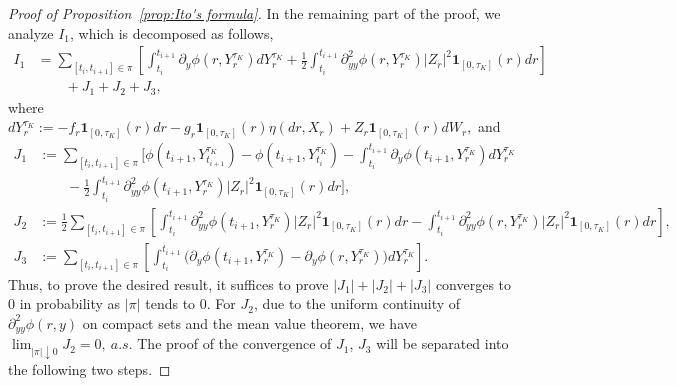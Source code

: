 \documentclass[10pt,a4paper]{amsart}
\begin{document}
\begin{proof}[Proof of Proposition~\ref{prop:Ito's formula}]
In the remaining part of the proof, we analyze $I_{1}$, which is decomposed as follows,
\begin{equation}\label{e:I1}	\begin{aligned}
I_{1} &= \sum_{[t_{i},t_{i+1}]\in \pi}\left[\int_{t_{i}}^{t_{i+1}}\partial_{y}\phi(r,Y^{\tau_{K}}_{r})dY^{\tau_{K}}_{r} + \frac{1}{2}\int_{t_{i}}^{t_{i+1}}\partial^{2}_{yy}\phi(r,Y^{\tau_{K}}_{r})|Z_{r}|^{2}\mathbf{1}_{[0,\tau_{K}]}(r) dr\right]\\
& \qquad + J_{1} + J_{2} + J_{3},
\end{aligned}
\end{equation}
where $dY^{\tau_{K}}_{r} := -f_{r}\mathbf{1}_{[0,\tau_{K}]}(r)dr - g_{r}\mathbf{1}_{[0,\tau_{K}]}(r)\eta(dr,X_{r}) + Z_{r}\mathbf{1}_{[0,\tau_{K}]}(r) dW_{r},$ and
\begin{align*}
J_{1} &:= \sum_{[t_{i},t_{i+1}]\in \pi} \Bigg[\phi(t_{i+1},Y^{\tau_{K}}_{t_{i+1}}) - \phi(t_{i+1},Y^{\tau_{K}}_{t_{i}}) - \int_{t_{i}}^{t_{i+1}}\partial_{y}\phi(t_{i+1},Y^{\tau_{K}}_{r}) dY^{\tau_{K}}_{r}\\
&\qquad  - \frac{1}{2}\int_{t_{i}}^{t_{i+1}}\partial^{2}_{yy}\phi(t_{i+1},Y^{\tau_{K}}_{r})|Z_{r}|^{2}\mathbf{1}_{[0,\tau_{K}]}(r)dr\Bigg],\\
J_{2} &:= \frac{1}{2}\sum_{[t_{i},t_{i+1}]\in \pi}\left[\int_{t_{i}}^{t_{i+1}}\partial^{2}_{yy}\phi(t_{i+1},Y^{\tau_{K}}_{r})|Z_{r}|^{2}\mathbf{1}_{[0,\tau_{K}]}(r)dr - \int_{t_{i}}^{t_{i+1}}\partial^{2}_{yy}\phi(r,Y^{\tau_{K}}_{r})|Z_{r}|^{2}\mathbf{1}_{[0,\tau_{K}]}(r)dr\right],\\
J_{3} &:= \sum_{[t_{i},t_{i+1}]\in\pi}\left[\int_{t_{i}}^{t_{i+1}}\big(\partial_{y}\phi(t_{i+1},Y^{\tau_{K}}_{r}) - \partial_{y}\phi(r,Y^{\tau_{K}}_{r})\big) dY^{\tau_{K}}_{r}\right].
\end{align*}
Thus, to prove the desired result, it suffices to prove $|J_1|+|J_2| +|J_3|$ converges to 0 in probability as $|\pi|$ tends to 0. For $J_{2}$, due to the uniform continuity of $\partial^{2}_{yy}\phi(r,y)$ on compact sets and the mean value theorem, we have 
$\lim_{|\pi|\downarrow 0}J_{2} = 0,\ a.s.$  The proof of the convergence of $J_1$, $J_3$ will be separated into the following two steps.


\end{proof}
\end{document}
